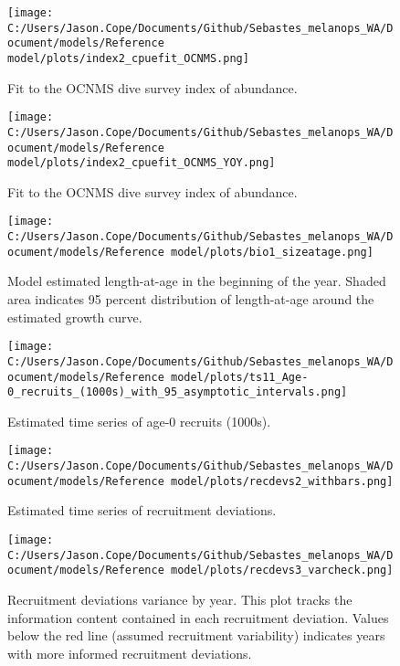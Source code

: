 \documentclass[11pt,
  english,
  letterpaper,
]{article}
\begin{document}
\begin{figure}
\centering
\texttt{[image: C:/Users/Jason.Cope/Documents/Github/Sebastes\_melanops\_WA/Document/models/Reference model/plots/index2\_cpuefit\_OCNMS.png]}
\caption{Fit to the OCNMS dive survey index of abundance.\label{fig:ocnms-index-fit}}
\end{figure}

\begin{figure}
\centering
\texttt{[image: C:/Users/Jason.Cope/Documents/Github/Sebastes\_melanops\_WA/Document/models/Reference model/plots/index2\_cpuefit\_OCNMS\_YOY.png]}
\caption{Fit to the OCNMS dive survey index of abundance.\label{fig:ocnms-yoy-index-fit}}
\end{figure}

\begin{figure}
\centering
\texttt{[image: C:/Users/Jason.Cope/Documents/Github/Sebastes\_melanops\_WA/Document/models/Reference model/plots/bio1\_sizeatage.png]}
\caption{Model estimated length-at-age in the beginning of the year. Shaded area indicates 95 percent distribution of length-at-age around the estimated growth curve.\label{fig:len-age-ss}}
\end{figure}

\begin{figure}
\centering
\texttt{[image: C:/Users/Jason.Cope/Documents/Github/Sebastes\_melanops\_WA/Document/models/Reference model/plots/ts11\_Age-0\_recruits\_(1000s)\_with\_95\_asymptotic\_intervals.png]}
\caption{Estimated time series of age-0 recruits (1000s).\label{fig:recruits}}
\end{figure}

\begin{figure}
\centering
\texttt{[image: C:/Users/Jason.Cope/Documents/Github/Sebastes\_melanops\_WA/Document/models/Reference model/plots/recdevs2\_withbars.png]}
\caption{Estimated time series of recruitment deviations.\label{fig:rec-devs}}
\end{figure}

\begin{figure}
\centering
\texttt{[image: C:/Users/Jason.Cope/Documents/Github/Sebastes\_melanops\_WA/Document/models/Reference model/plots/recdevs3\_varcheck.png]}
\caption{Recruitment deviations variance by year. This plot tracks the information content contained in each recruitment deviation. Values below the red line (assumed recruitment variability) indicates years with more informed recruitment deviations.\label{fig:rec-devs-sigmas}}
\end{figure}
\end{document}
